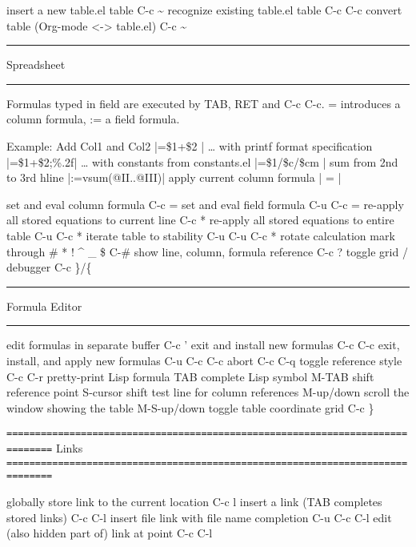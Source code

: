 \documentclass[10pt,a4paper]{article}
\begin{document}
insert a new table.el table                       C-c \textasciitilde{}
recognize existing table.el table                 C-c C-c
convert table (Org-mode <-> table.el)             C-c \textasciitilde{}

\rule{\linewidth}{0.5pt}
Spreadsheet

\rule{\linewidth}{0.5pt}

Formulas typed in field are executed by TAB,
RET and C-c C-c.  = introduces a column
formula, := a field formula.

Example: Add Col1 and Col2                        |=\$1+\$2      |
\ldots{} with printf format specification              |=\$1+\$2;\%.2f|
\ldots{} with constants from constants.el              |=\$1/\$c/\$cm |
sum from 2nd to 3rd hline                         |:=vsum(@II..@III)|
apply current column formula                      | = |

set and eval column formula                       C-c =
set and eval field formula                        C-u C-c =
re-apply all stored equations to current line     C-c *
re-apply all stored equations to entire table     C-u C-c *
iterate table to stability                        C-u C-u C-c *
rotate calculation mark through \# * ! \^{} \_ \$       C-\#
show line, column, formula reference              C-c ?
toggle grid / debugger                            C-c \}/\{

\rule{\linewidth}{0.5pt}
Formula Editor

\rule{\linewidth}{0.5pt}

edit formulas in separate buffer                  C-c '
exit and install new formulas                     C-c C-c
exit, install, and apply new formulas             C-u C-c C-c
abort                                             C-c C-q
toggle reference style                            C-c C-r
pretty-print Lisp formula                         TAB
complete Lisp symbol                              M-TAB
shift reference point                             S-cursor
shift test line for column references             M-up/down
scroll the window showing the table               M-S-up/down
toggle table coordinate grid                      C-c \}

\texttt{==============================================================================}
Links
\texttt{==============================================================================}

globally store link to the current location       C-c l \noteone
insert a link (TAB completes stored links)        C-c C-l
insert file link with file name completion        C-u C-c C-l
edit (also hidden part of) link at point          C-c C-l
\end{document}
